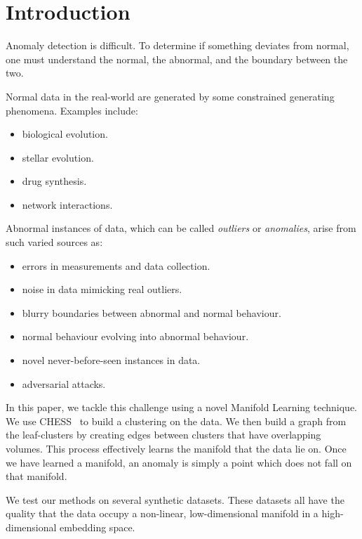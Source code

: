 \section{Introduction}
\label{sec:introduction}

Anomaly detection is difficult.
To determine if something deviates from normal, one must understand the normal, the abnormal, and the boundary between the two.

Normal data in the real-world are generated by some constrained generating phenomena.
Examples include:
\begin{itemize}
    \item biological evolution.
    \item stellar evolution.
    \item drug synthesis.
    \item network interactions.
\end{itemize}

Abnormal instances of data, which can be called \textit{outliers} or \textit{anomalies}, arise from such varied sources as:
\begin{itemize}
    \item errors in measurements and data collection.
    \item noise in data mimicking real outliers.
    \item blurry boundaries between abnormal and normal behaviour.
    \item normal behaviour evolving into abnormal behaviour.
    \item novel never-before-seen instances in data.
    \item adversarial attacks.
\end{itemize}

In this paper, we tackle this challenge using a novel Manifold Learning technique.
We use CHESS~\cite{ishaq2019entropy} to build a clustering on the data.
We then build a graph from the leaf-clusters by creating edges between clusters that have overlapping volumes.
This process effectively learns the manifold that the data lie on.
Once we have learned a manifold, an anomaly is simply a point which does not fall on that manifold.

We test our methods on several synthetic datasets. These datasets all have the quality that the data occupy a non-linear, low-dimensional manifold in a high-dimensional embedding space.

